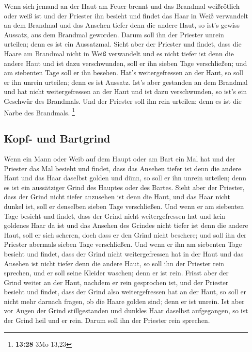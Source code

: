  Wenn sich jemand an der Haut am Feuer brennt und das
Brandmal weißrötlich oder weiß ist  und der Priester ihn
besieht und findet das Haar in Weiß verwandelt an dem Brandmal und das
Ansehen tiefer denn die andere Haut, so ist's gewiss Aussatz, aus dem
Brandmal geworden. Darum soll ihn der Priester unrein urteilen; denn es
ist ein Aussatzmal.  Sieht aber der Priester und findet,
dass die Haare am Brandmal nicht in Weiß verwandelt und es nicht tiefer
ist denn die andere Haut und ist dazu verschwunden, soll er ihn sieben
Tage verschließen;  und am siebenten Tage soll er ihn
besehen. Hat's weitergefressen an der Haut, so soll er ihn unrein
urteilen; denn es ist Aussatz.  Ist's aber gestanden an
dem Brandmal und hat nicht weitergefressen an der Haut und ist dazu
verschwunden, so ist's ein Geschwür des Brandmals. Und der Priester soll
ihn rein urteilen; denn es ist die Narbe des Brandmals. \footnote{\textbf{13:28}
  3Mo 13,23}

\hypertarget{kopf--und-bartgrind}{%
\subsection{Kopf- und Bartgrind}\label{kopf--und-bartgrind}}

 Wenn ein Mann oder Weib auf dem Haupt oder am Bart ein
Mal hat  und der Priester das Mal besieht und findet,
dass das Ansehen tiefer ist denn die andere Haut und das Haar daselbst
golden und dünn, so soll er ihn unrein urteilen; denn es ist ein
aussätziger Grind des Hauptes oder des Bartes.  Sieht
aber der Priester, dass der Grind nicht tiefer anzusehen ist denn die
Haut, und das Haar nicht dunkel ist, soll er denselben sieben Tage
verschließen.  Und wenn er am siebenten Tage besieht und
findet, dass der Grind nicht weitergefressen hat und kein goldenes Haar
da ist und das Ansehen des Grindes nicht tiefer ist denn die andere
Haut,  soll er sich scheren, doch dass er den Grind nicht
beschere; und soll ihn der Priester abermals sieben Tage verschließen.
 Und wenn er ihn am siebenten Tage besieht und findet,
dass der Grind nicht weitergefressen hat in der Haut und das Ansehen ist
nicht tiefer denn die andere Haut, so soll ihn der Priester rein
sprechen, und er soll seine Kleider waschen; denn er ist rein.
 Frisst aber der Grind weiter an der Haut, nachdem er
rein gesprochen ist,  und der Priester besieht und
findet, dass der Grind also weitergefressen hat an der Haut, so soll er
nicht mehr darnach fragen, ob die Haare golden sind; denn er ist unrein.
 Ist aber vor Augen der Grind stillgestanden und dunkles
Haar daselbst aufgegangen, so ist der Grind heil und er rein. Darum soll
ihn der Priester rein sprechen.

